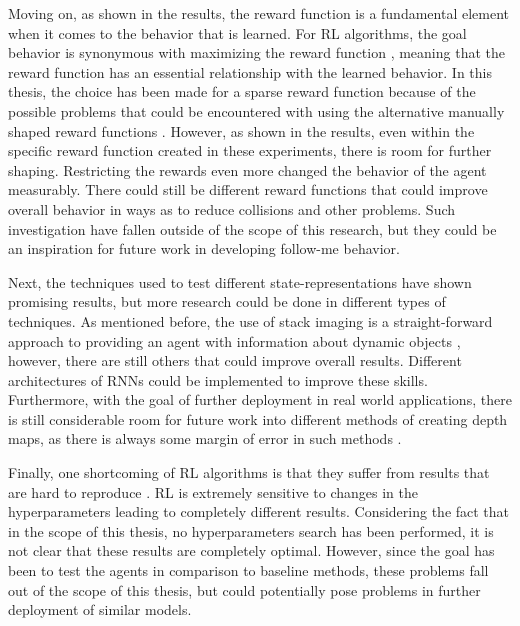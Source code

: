 Moving on, as shown in the results, the reward function is a fundamental element 
when it comes to the behavior that is learned. For RL algorithms, the goal behavior is 
synonymous with maximizing the reward function \cite{RLBook}, meaning that the reward 
function has an essential relationship with the learned behavior. In this thesis, 
the choice has been made for a sparse reward function because of the possible problems 
that could be encountered with using the alternative manually shaped reward functions 
\cite{sparserewardsarebetter,nonsparserewardissuboptimal}. However, as shown in the 
results, even within the specific reward function created in these experiments, there 
is room for further shaping. Restricting the rewards even more changed the behavior 
of the agent measurably. There could still be different reward functions that could 
improve overall behavior in ways as to reduce collisions and other problems. Such 
investigation have fallen outside of the scope of this research, but they could 
be an inspiration for future work in developing follow-me behavior. 

Next, the techniques used to test different state-representations have shown 
promising results, but more research could be done in different types of 
techniques. As mentioned before, the use of stack imaging is a straight-forward 
approach to providing an agent with information about dynamic objects \cite{rlsolvingatari,DepthAndStackResearch}, 
however, there are still others that could improve overall results. Different 
architectures of RNNs could be implemented to improve these skills. Furthermore,
with the goal of further deployment in real world applications, there is still 
considerable room for future work into different methods of creating depth maps, 
as there is always some margin of error in such methods \cite{lidarinselfdrivingcar, stereovision, DepthFromMonocularImage}.

Finally, one shortcoming of RL algorithms is that they suffer from results that 
are hard to reproduce \cite{RLisSuperannoying}. 
RL is extremely sensitive to changes in the hyperparameters leading to completely 
different results. Considering the fact that in the scope of this thesis, no 
hyperparameters search has been performed, it is not clear that these results 
are completely optimal. However, since the goal has been to test the agents 
in comparison to baseline methods, these problems fall out of the scope of this thesis, 
but could potentially pose problems in further deployment of similar models. 

